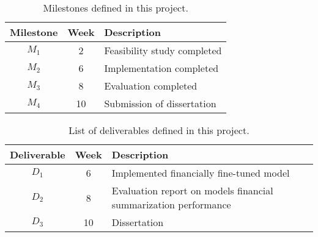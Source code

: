 \begin{table}[htbp]
    \begin{center}
        \begin{tabular}{|c|c|l|}
        \hline
        \textbf{Milestone} & \textbf{Week} & \textbf{Description} \\
        \hline
        $M_1$ & 2 & Feasibility study completed \\
        $M_2$ & 6 & Implementation completed \\
        $M_3$ & 8 & Evaluation completed \\
        $M_4$ & 10 & Submission of dissertation \\
        \hline
        \end{tabular}
    \end{center}
    \caption{Milestones defined in this project.}
    \label{tab:milestones}
\end{table}

\begin{table}[htbp]
    \begin{center}
        \begin{tabular}{|c|c|l|}
        \hline
        \textbf{Deliverable} & \textbf{Week} & \textbf{Description} \\
        \hline
        $D_1$ & 6 & Implemented financially fine-tuned model \\
        $D_2$ & 8 & Evaluation report on models financial summarization performance \\
        $D_3$ & 10 & Dissertation \\
        \hline
        \end{tabular}
    \end{center}
    \caption{List of deliverables defined in this project.}
    \label{tab:deliverables}
\end{table}
